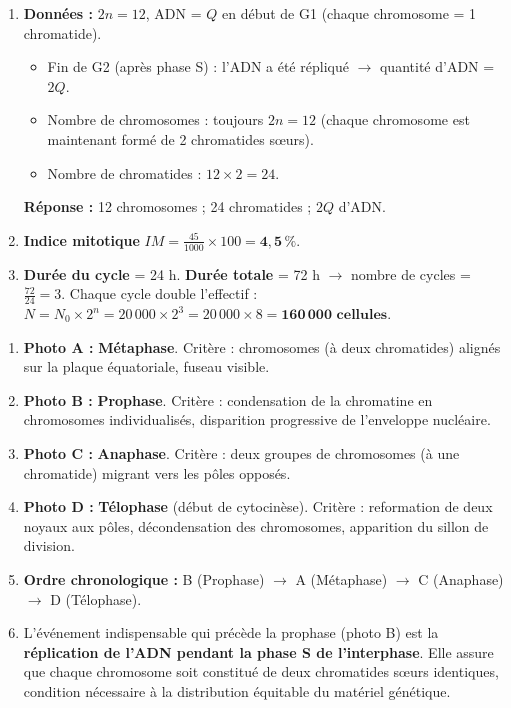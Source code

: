 \documentclass[11pt]{article}
\begin{document}
\begin{corrige}
\begin{enumerate}
\item \textbf{Données :} $2n = 12$, ADN = $Q$ en début de G1 (chaque chromosome = 1 chromatide).
\begin{itemize}
\item Fin de G2 (après phase S) : l'ADN a été répliqué $\rightarrow$ quantité d'ADN = $2Q$.
\item Nombre de chromosomes : toujours $2n = 12$ (chaque chromosome est maintenant formé de 2 chromatides sœurs).
\item Nombre de chromatides : $12 \times 2 = 24$.
\end{itemize}
\textbf{Réponse :} 12 chromosomes ; 24 chromatides ; $2Q$ d'ADN.

\item \textbf{Indice mitotique} $IM = \frac{45}{1000} \times 100 = \mathbf{4,5\,\%}$.

\item \textbf{Durée du cycle} = 24 h. \textbf{Durée totale} = 72 h $\rightarrow$ nombre de cycles = $\frac{72}{24} = 3$.
Chaque cycle double l'effectif : $N = N_0 \times 2^n = 20\,000 \times 2^3 = 20\,000 \times 8 = \mathbf{160\,000 \text{ cellules}}$.
\end{enumerate}
\end{corrige}

\begin{corrige}
\begin{enumerate}
\item \textbf{Photo A :} \textbf{Métaphase}. Critère : chromosomes (à deux chromatides) alignés sur la plaque équatoriale, fuseau visible.
\item \textbf{Photo B :} \textbf{Prophase}. Critère : condensation de la chromatine en chromosomes individualisés, disparition progressive de l'enveloppe nucléaire.
\item \textbf{Photo C :} \textbf{Anaphase}. Critère : deux groupes de chromosomes (à une chromatide) migrant vers les pôles opposés.
\item \textbf{Photo D :} \textbf{Télophase} (début de cytocinèse). Critère : reformation de deux noyaux aux pôles, décondensation des chromosomes, apparition du sillon de division.

\item \textbf{Ordre chronologique :} B (Prophase) $\rightarrow$ A (Métaphase) $\rightarrow$ C (Anaphase) $\rightarrow$ D (Télophase).

\item L'événement indispensable qui précède la prophase (photo B) est la \textbf{réplication de l'ADN pendant la phase S de l'interphase}. Elle assure que chaque chromosome soit constitué de deux chromatides sœurs identiques, condition nécessaire à la distribution équitable du matériel génétique.
\end{enumerate}
\end{corrige}
\end{document}
